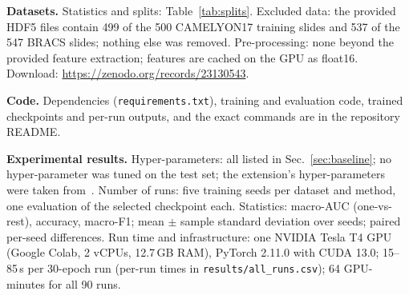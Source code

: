 \documentclass[conference]{IEEEtran}
\begin{document}
\smallskip\noindent\textbf{Datasets.}
Statistics and splits: Table~\ref{tab:splits}.
Excluded data: the provided HDF5 files contain 499 of the 500 CAMELYON17 training slides and 537 of the 547 BRACS slides; nothing else was removed.
Pre-processing: none beyond the provided feature extraction; features are cached on the GPU as float16.
Download: \url{https://zenodo.org/records/23130543}.

\smallskip\noindent\textbf{Code.} Dependencies (\texttt{requirements.txt}), training and evaluation code, trained checkpoints and per-run outputs, and the exact commands are in the repository README.

\smallskip\noindent\textbf{Experimental results.}
Hyper-parameters: all listed in Sec.~\ref{sec:baseline}; no hyper-parameter was tuned on the test set; the extension's hyper-parameters were taken from~\cite{zhang2024acmil}.
Number of runs: five training seeds per dataset and method, one evaluation of the selected checkpoint each.
Statistics: macro-AUC (one-vs-rest), accuracy, macro-F1; mean $\pm$ sample standard deviation over seeds; paired per-seed differences.
Run time and infrastructure: one NVIDIA Tesla T4 GPU (Google Colab, 2 vCPUs, 12.7\,GB RAM), PyTorch 2.11.0 with CUDA 13.0; 15--85\,s per 30-epoch run (per-run times in \texttt{results/all\_runs.csv}); 64 GPU-minutes for all 90 runs.

\end{document}
